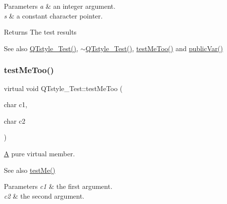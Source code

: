 \begin{DoxyParams}{Parameters}
{\em a} & an integer argument. \\
\hline
{\em s} & a constant character pointer. \\
\hline
\end{DoxyParams}
\begin{DoxyReturn}{Returns}
The test results 
\end{DoxyReturn}
\begin{DoxySeeAlso}{See also}
\mbox{\hyperlink{class_q_tstyle___test_a14a296ea4e2ad446712f2310bec60766}{Q\+Tstyle\+\_\+\+Test()}}, \mbox{\hyperlink{class_q_tstyle___test_a7e82397d534d9a867f0857da01a46e9e}{$\sim$\+Q\+Tstyle\+\_\+\+Test()}}, \mbox{\hyperlink{class_q_tstyle___test_ad5b201f097a720d44bf976c2f27efbda}{test\+Me\+Too()}} and \mbox{\hyperlink{class_q_tstyle___test_aabf7b2e9ed83ea44aca4d213baae06d3}{public\+Var()}} 
\end{DoxySeeAlso}
\mbox{\label{class_q_tstyle___test_ad5b201f097a720d44bf976c2f27efbda}} 
\subsubsection{\texorpdfstring{testMeToo()}{testMeToo()}}
{\footnotesize\ttfamily virtual void Q\+Tstyle\+\_\+\+Test\+::test\+Me\+Too (\begin{DoxyParamCaption}\item[{char}]{c1,  }\item[{char}]{c2 }\end{DoxyParamCaption})\hspace{0.3cm}{\ttfamily [pure virtual]}}



\mbox{\hyperlink{class_a}{A}} pure virtual member. 

\begin{DoxySeeAlso}{See also}
\mbox{\hyperlink{class_q_tstyle___test_a8840748753118dd468e8368a28e49c62}{test\+Me()}} 
\end{DoxySeeAlso}

\begin{DoxyParams}{Parameters}
{\em c1} & the first argument. \\
\hline
{\em c2} & the second argument. \\
\hline
\end{DoxyParams}


